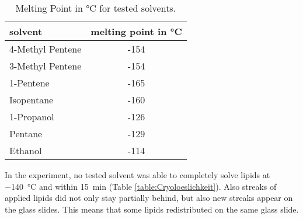 \begin{table}[hbt!]
	\centering
	\begin{tabular}{|l|c|}
		\hline
		solvent & melting point in °C \\
		\hline
		\hline
		4-Methyl Pentene & -154 \\ 
		\hline
		3-Methyl Pentene & -154 \\
		\hline
		1-Pentene & -165 \\
		\hline
		Isopentane & -160 \\
		\hline
		1-Propanol & -126 \\
		\hline
		Pentane & -129 \\
		\hline
		Ethanol & -114 \\
		\hline
	\end{tabular}
	\caption{Melting Point in °C for tested solvents.}
	\label{table:SchmelztemperaturLösungsmittel}
\end{table}


In the experiment, no tested solvent was able to completely solve lipids at \SI{-140}{\degreeCelsius} and within \SI{15}{\minute} (Table \ref{table:Cryoloeslichkeit}). Also streaks of applied lipids did not only stay partially behind, but also new streaks appear on the glass slides. This means that some lipids redistributed on the same glass slide.

